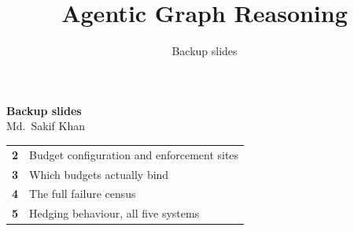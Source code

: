 %
%


\title{Agentic Graph Reasoning}
\subtitle{Backup slides}



{
\begin{frame}[plain]
  \vfill
  \centering
  {\Large\bfseries\color{agrdark} Backup slides}\\[3mm]
  {\large Md.\ Sakif Khan }\\[6mm]
  \begin{minipage}{0.72\textwidth}
    \small
    \begin{tabular}{@{}rL{62mm}@{}}
      \textbf{2} & Budget configuration and enforcement sites \\
      \textbf{3} & Which budgets actually bind \\
      \textbf{4} & The full failure census \\
      \textbf{5} & Hedging behaviour, all five systems \\
    \end{tabular}
  \end{minipage}
  \vfill
\end{frame}}



